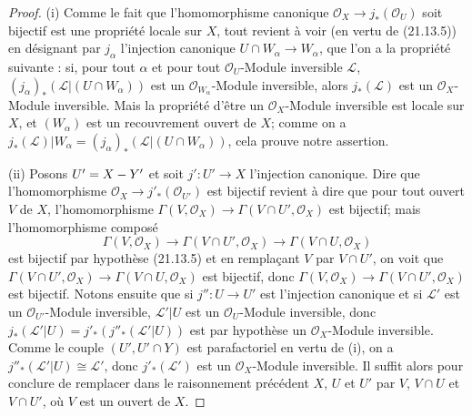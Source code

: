 \begin{proof}
(i) Comme le fait que l'homomorphisme canonique
$\mathcal O_X\to j_*(\mathcal O_U)$ soit bijectif est une propriété locale sur $X$,
tout revient à voir (en vertu de (21.13.5)) en désignant par
$j_\alpha$ l'injection canonique $U\cap W_\alpha\to W_\alpha$, que l'on a la propriété
suivante : si, pour tout $\alpha$ et pour tout $\mathcal O_U$-Module inversible
$\mathscr L$, $(j_\alpha)_*(\mathscr L|(U\cap W_\alpha))$ est un
$\mathcal O_{W_\alpha}$-Module inversible, alors $j_*(\mathscr L)$ est un
$\mathcal O_X$-Module inversible. Mais la propriété d'être un $\mathcal O_X$-Module
inversible est locale sur $X$, et $(W_\alpha)$ est un recouvrement ouvert de $X$;
comme on a
$j_*(\mathscr L)|W_\alpha=(j_\alpha)_*(\mathscr L|(U\cap W_\alpha))$, cela prouve notre assertion.

(ii) Posons $U'=X- Y'$ et soit $j':U'\to X$ l'injection canonique. Dire que
l'homomorphisme $\mathcal O_X\to j'_*(\mathcal O_{U'})$ est bijectif revient à dire
que pour tout ouvert $V$ de $X$, l'homomorphisme
$\Gamma(V,\mathcal O_X)\to\Gamma(V\cap U',\mathcal O_X)$ est bijectif; mais
l'homomorphisme composé
\[
  \Gamma(V,\mathcal O_X)\longrightarrow\Gamma(V\cap U',\mathcal O_X)
  \longrightarrow\Gamma(V\cap U,\mathcal O_X)
\]
est bijectif par hypothèse (21.13.5) et en remplaçant $V$ par $V\cap U'$, on voit que
$\Gamma(V\cap U',\mathcal O_X)\to\Gamma(V\cap U,\mathcal O_X)$ est bijectif, donc
$\Gamma(V,\mathcal O_X)\to\Gamma(V\cap U',\mathcal O_X)$ est bijectif. Notons ensuite
que si $j'':U\to U'$ est l'injection canonique et si $\mathscr L'$ est un
$\mathcal O_{U'}$-Module inversible, $\mathscr L'|U$ est un $\mathcal O_U$-Module
inversible, donc
$j_*(\mathscr L'|U)=j'_*(j''_*(\mathscr L'|U))$ est par hypothèse un
$\mathcal O_X$-Module inversible. Comme le couple $(U',U'\cap Y)$ est parafactoriel
en vertu de (i), on a $j''_*(\mathscr L'|U)\cong\mathscr L'$, donc
$j'_*(\mathscr L')$ est un $\mathcal O_X$-Module inversible. Il suffit alors pour
conclure de remplacer dans le raisonnement précédent $X$, $U$ et $U'$ par $V$,
$V\cap U$ et $V\cap U'$, où $V$ est un ouvert de $X$.


\end{proof}
